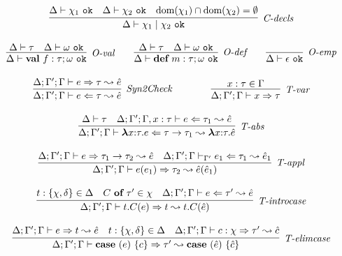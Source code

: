 \begin{figure}
\[\begin{array}{c}
\infer[\textit{C-decls}]
	{\Delta \vdash  \chi_1 \bnfalt \chi_2~\texttt{ok}} 
	{\Delta \vdash \chi_1~\texttt{ok} & \Delta \vdash \chi_2~\texttt{ok} & \text{dom}(\chi_1) \intersect \text{dom}(\chi_2) = \emptyset}\\[3ex]

\infer[\textit{O-val}]
	{\Delta \vdash \keyw{val}~ f:\tau; \omega \ \texttt{ok} }
	{\Delta \vdash \tau & \Delta \vdash \omega \ \texttt{ok} }
~~~~~~	
\infer[\textit{O-def}]
	{\Delta \vdash \keyw{def}~ m:\tau; \omega \ \texttt{ok} }
	{\Delta \vdash \tau & \Delta \vdash \omega \ \texttt{ok} }
~~~~~~
\infer[\textit{O-emp}]
	{\Delta \vdash \epsilon \ \texttt{ok}}
	{ }\\[3ex]

\infer[\textit{Syn2Check}]
	{\Delta; \Gamma'; \Gamma \vdash  e \Leftarrow \tau \leadsto \hat{e}} 
	{\Delta; \Gamma'; \Gamma \vdash e \Rightarrow \tau \leadsto \hat{e}   }
~~~~~~~~~~~~
\infer[\textit{T-var}]
	{\Delta; \Gamma'; \Gamma \vdash x\Rightarrow\tau } 
	{x:\tau \in \Gamma }\\[3ex]

\infer[\textit{T-abs}]
	{\Delta; \Gamma'; \Gamma \vdash  \boldsymbol\lambda x{:}\tau . e \Leftarrow \tau \rightarrow \tau_1 \leadsto \boldsymbol\lambda x{:}\tau .\hat{e}} 
	{\Delta\vdash \tau & \Delta; \Gamma'; \Gamma, x:\tau \vdash e\Leftarrow \tau_1 \leadsto \hat{e}}\\[3ex]

\infer[\textit{T-appl}]
	{\Delta; \Gamma'; \Gamma \vdash  e(e_1) \Rightarrow \tau_2  \leadsto \hat{e}(\hat{e}_1) } 
	{\Delta; \Gamma'; \Gamma \vdash e \Rightarrow \tau_1 \rightarrow \tau_2  \leadsto \hat{e}  & \Delta; \Gamma'; \Gamma \vdash_{\Gamma'} e_1 \Leftarrow \tau_1 \leadsto \hat{e}_1 }\\[3ex]

\infer[\textit{T-introcase}]
	{\Delta; \Gamma'; \Gamma \vdash  t.C(e) \Rightarrow t  \leadsto t.C(\hat{e}) } 
	{t:\{\chi, \delta\} \in \Delta & C\ \keyw{of}\ \tau' \in \chi &\Delta; \Gamma'; \Gamma \vdash e \Leftarrow \tau'  \leadsto \hat{e}}\\[3ex]

\infer[\textit{T-elimcase}]
	{\Delta; \Gamma'; \Gamma \vdash  \keyw{case}~(e)~\{ c \} \Rightarrow \tau'  \leadsto \keyw{case}~(\hat{e})~\{ \hat{c} \} } 
	{\Delta; \Gamma'; \Gamma \vdash e \Rightarrow t  \leadsto \hat{e}  & t:\{ \chi,\delta\} \in \Delta & \Delta; \Gamma'; \Gamma \vdash c:\chi \Rightarrow \tau' \leadsto \hat{c}}\\[3ex]


\end{array}\]
\end{figure}
